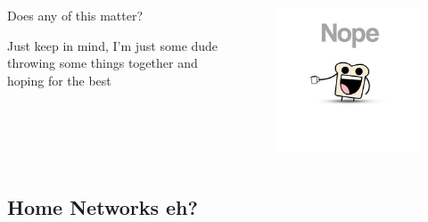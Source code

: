 \documentclass{beamer}
\begin{document}
\begin{frame}
    \begin{columns}
        \begin{column}{0.5\textwidth}
            Does any of this matter?
            \vspace{5mm}\par\noindent
            Just keep in mind, I'm just some dude throwing some things together
            and hoping for the best
        \end{column}
        \begin{column}{0.5\textwidth}
            \begin{figure}
                \centering
                \includegraphics[width=\textwidth,keepaspectratio]{../resources/nope.jpg}
            \end{figure}
        \end{column}
    \end{columns}
\end{frame}

\subsection{Home Networks eh?}
\end{document}
